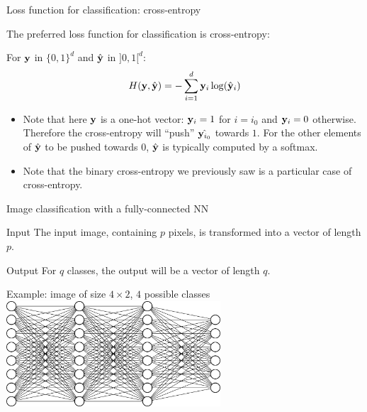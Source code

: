 \documentclass[xcolor=pdftex,dvipsnames,table,mathserif]{beamer}
\begin{document}
\begin{frame}{Loss function for classification: cross-entropy}

  The preferred loss function for classification is cross-entropy:

  \begin{block}{}
    For $\mathbf{y}$ in $\{0, 1\}^d$ and $\hat{\mathbf{y}}$ in $]0, 1[^d$:
        \[
        H(\mathbf{y}, \hat{\mathbf{y}}) = - \sum_{i=1}^d \mathbf{y}_i \log(\hat{\mathbf{y}}_i)
        \]
  \end{block}

  \pause

\begin{itemize}
\item   Note that here $\mathbf{y}$ is a one-hot vector: $\mathbf{y}_i = 1$ for $i=i_0$ and $\mathbf{y}_i=0$ otherwise. Therefore the cross-entropy will ``push'' $\hat{\mathbf{y}_{i_0}}$ towards $1$. For the other elements of $\hat{\mathbf{y}}$ to be pushed towards $0$, $\hat{\mathbf{y}}$ is typically computed by a softmax.
  \pause
\item   Note that the binary cross-entropy we previously saw is a particular case of cross-entropy.

\end{itemize}

\end{frame}

\begin{frame}{Image classification with a fully-connected NN}

  \begin{block}{Input}
    The input image, containing $p$ pixels, is transformed into a vector of length $p$.
  \end{block}

  \begin{block}{Output}
    For $q$ classes, the output will be a vector of length $q$.
  \end{block}

  \pause

  \begin{block}{Example: image of size $4 \times 2$, $4$ possible classes}
    \centering
    \includegraphics[width=0.6\textwidth]{mini_reseau3_bis}
  \end{block}

\end{frame}
\end{document}
